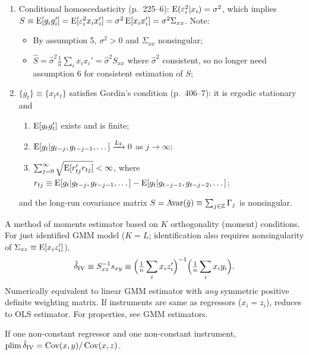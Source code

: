 \documentclass[8pt,letterpaper, landscape]{extarticle} %
\begin{document}
\begin{multicols}{3}
\begin{description}
\begin{enumerate}
\item Conditional homoscedasticity (p.~225--6): $ \operatorname{E} (\varepsilon_i^2 | x_i) = \sigma^2 $, which implies $ S \equiv \operatorname{E} [g_i g_{i}' ] = \operatorname{E} [\varepsilon_{i}^2 x_i x_{i}' ] = \sigma^2 \operatorname{E} [x_i x_i'] = \sigma^2 \Sigma_{xx} $. Note:
\begin{itemize}
\item By assumption 5, $ \sigma^2 > 0 $ and $ \Sigma_{xx} $ nonsingular;
\item $ \widehat{S} = \hat{\sigma}^2 \tfrac{1}{n} \sum_i x_i x_{i}' = \hat{\sigma}^2 S_{xx} $ where $ \hat{\sigma}^2 $ consistent, so no longer need assumption 6 for consistent estimation of $ S $;
\end{itemize}
\item $ \{ g_t \} \equiv \{ x_t \epsilon_t \} $ satisfies Gordin's condition (p.~406--7): it is ergodic stationary and
\begin{enumerate}
\item $ \operatorname{E} [g_t g_{t}'] $ exists and is finite;
\item $ \operatorname{E} [g_t | g_{t-j} , g_{t-j-1} , \dotsc ] \xrightarrow{L_2} 0 $ as $ j \to \infty $;
\item $ \sum_{j=0}^{\infty} \sqrt{\operatorname{E} [r_{tj}' r_{tj}]} < \infty $, where $ r_{tj} \equiv \operatorname{E} [g_t | g_{t-j} , g_{t-j-1} , \dotsc ] - \operatorname{E} [g_t | g_{t-j-1} , g_{t-j-2} , \dotsc ] $;
\end{enumerate}
and the long-run covariance matrix $ S = \operatorname{Avar} (\bar{g}) \equiv \sum_{j \in \mathbb{Z}} \Gamma_j $ is nonsingular.
\end{enumerate}

 A method of moments estimator based on $ K $ orthogonality (moment) conditions. For just identified GMM model ($ K = L $; identification also requires nonsingularity of $ \Sigma_{xz} \equiv \operatorname{E} [x_i z_i'] $),
$$ \hat{\delta}_{\text{IV}} \equiv S_{xz}^{-1} s_{xy} \equiv \Bigl ( \tfrac{1}{n} \sum_{i} x_i z_i' \Bigr )^{-1} \Bigr ( \tfrac{1}{n} \sum_{i} x_i y_i \Big ). $$
Numerically equivalent to linear GMM estimator with \textit{any} symmetric positive definite weighting matrix. If instruments are same as regressors ($ x_i = z_i $), reduces to OLS estimator. For properties, see GMM estimators.

If one non-constant regressor and one non-constant instrument, $ \operatorname*{plim} \hat{\delta}_{\text{IV}} = \operatorname{Cov} (x, y) / \operatorname{Cov} (x, z) $.


\end{description}
\end{multicols}
\end{document}

